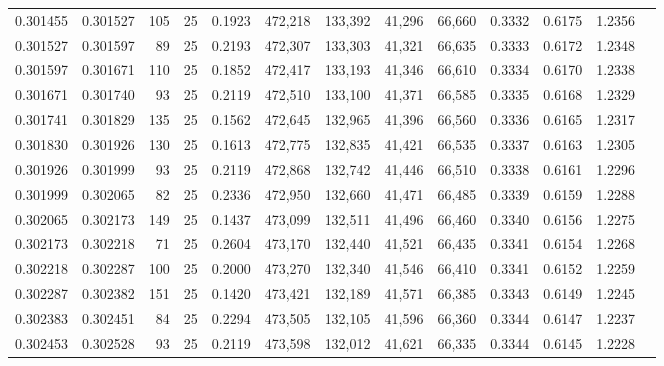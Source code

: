 \begin{tabular}{rrrrrrrrrrrrr}
0.301455 & 0.301527 &   105 &  25 &                                     0.1923 & 472,218 & 133,392 &  41,296 &  66,660 & 0.3332 & 0.6175 & 1.2356 \\
0.301527 & 0.301597 &    89 &  25 &                                     0.2193 & 472,307 & 133,303 &  41,321 &  66,635 & 0.3333 & 0.6172 & 1.2348 \\
0.301597 & 0.301671 &   110 &  25 &                                     0.1852 & 472,417 & 133,193 &  41,346 &  66,610 & 0.3334 & 0.6170 & 1.2338 \\
0.301671 & 0.301740 &    93 &  25 &                                     0.2119 & 472,510 & 133,100 &  41,371 &  66,585 & 0.3335 & 0.6168 & 1.2329 \\
0.301741 & 0.301829 &   135 &  25 &                                     0.1562 & 472,645 & 132,965 &  41,396 &  66,560 & 0.3336 & 0.6165 & 1.2317 \\
0.301830 & 0.301926 &   130 &  25 &                                     0.1613 & 472,775 & 132,835 &  41,421 &  66,535 & 0.3337 & 0.6163 & 1.2305 \\
0.301926 & 0.301999 &    93 &  25 &                                     0.2119 & 472,868 & 132,742 &  41,446 &  66,510 & 0.3338 & 0.6161 & 1.2296 \\
0.301999 & 0.302065 &    82 &  25 &                                     0.2336 & 472,950 & 132,660 &  41,471 &  66,485 & 0.3339 & 0.6159 & 1.2288 \\
0.302065 & 0.302173 &   149 &  25 &                                     0.1437 & 473,099 & 132,511 &  41,496 &  66,460 & 0.3340 & 0.6156 & 1.2275 \\
0.302173 & 0.302218 &    71 &  25 &                                     0.2604 & 473,170 & 132,440 &  41,521 &  66,435 & 0.3341 & 0.6154 & 1.2268 \\
0.302218 & 0.302287 &   100 &  25 &                                     0.2000 & 473,270 & 132,340 &  41,546 &  66,410 & 0.3341 & 0.6152 & 1.2259 \\
0.302287 & 0.302382 &   151 &  25 &                                     0.1420 & 473,421 & 132,189 &  41,571 &  66,385 & 0.3343 & 0.6149 & 1.2245 \\
0.302383 & 0.302451 &    84 &  25 &                                     0.2294 & 473,505 & 132,105 &  41,596 &  66,360 & 0.3344 & 0.6147 & 1.2237 \\
0.302453 & 0.302528 &    93 &  25 &                                     0.2119 & 473,598 & 132,012 &  41,621 &  66,335 & 0.3344 & 0.6145 & 1.2228 \\

\end{tabular}

